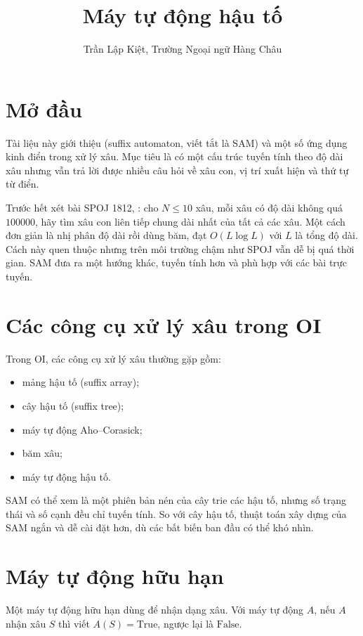 \documentclass[11pt]{article}
\title{Máy tự động hậu tố}
\author{Trần Lập Kiệt, Trường Ngoại ngữ Hàng Châu}
\date{}
\begin{document}
\maketitle


\section{Mở đầu}

Tài liệu này giới thiệu  (suffix automaton, viết tắt là
SAM) và một số ứng dụng kinh điển trong xử lý xâu.  Mục tiêu là có một cấu trúc
tuyến tính theo độ dài xâu nhưng vẫn trả lời được nhiều câu hỏi về xâu con,
vị trí xuất hiện và thứ tự từ điển.

Trước hết xét bài SPOJ 1812, : cho
$N \le 10$ xâu, mỗi xâu có độ dài không quá $100000$, hãy tìm xâu con liên tiếp
chung dài nhất của tất cả các xâu.  Một cách đơn giản là nhị phân độ dài rồi
dùng băm, đạt $O(L\log L)$ với $L$ là tổng độ dài.  Cách này quen thuộc nhưng
trên môi trường chậm như SPOJ vẫn dễ bị quá thời gian.  SAM đưa ra một hướng
khác, tuyến tính hơn và phù hợp với các bài trực tuyến.

\section{Các công cụ xử lý xâu trong OI}

Trong OI, các công cụ xử lý xâu thường gặp gồm:
\begin{itemize}
  \item mảng hậu tố (suffix array);
  \item cây hậu tố (suffix tree);
  \item máy tự động Aho--Corasick;
  \item băm xâu;
  \item máy tự động hậu tố.
\end{itemize}

SAM có thể xem là một phiên bản nén của cây trie các hậu tố, nhưng số trạng thái
và số cạnh đều chỉ tuyến tính.  So với cây hậu tố, thuật toán xây dựng của SAM
ngắn và dễ cài đặt hơn, dù các bất biến ban đầu có thể khó nhìn.

\section{Máy tự động hữu hạn}

Một máy tự động hữu hạn dùng để nhận dạng xâu.  Với máy tự động $A$, nếu $A$
nhận xâu $S$ thì viết $A(S)=\mathrm{True}$, ngược lại là $\mathrm{False}$.
\end{document}
